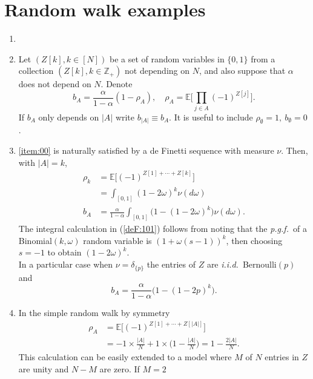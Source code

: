 \documentclass[preprint,11pt]{elsarticle}
\theoremstyle{remark}
\def\pgf{\emph{p.g.f.~}}
\def\iid{\emph{i.i.d.}~}
\begin{document}
{ \section{Random walk examples} \label{randomwalkexamples}
\begin{enumerate}[label=(\alph*)]
\item[]
%
\item \label{item:00}
Let $(Z[k], k \in [N])$ be a set of random variables in $\{0,1\}$ from a collection
$(Z[k], k \in \mathbb{Z}_+)$ not depending on $N$, and also suppose that $\alpha$ does not depend on $N$.
Denote
\begin{equation*}
b_A = \frac{\alpha}{1-\alpha}(1-\rho_A),\quad\rho_A = \mathbb{E}\Big [\prod_{j\in A}(-1)^{Z[j]}\Big ].
\label{bAdef:00}
\end{equation*}
If $b_A$ only depends on $|A|$ write $b_{|A|} \equiv b_A$.
It is useful to include $\rho_\emptyset = 1,\ b_\emptyset = 0$.
%
\item \label{item:01}
 \ref{item:00} is naturally satisfied by a de Finetti sequence with measure $\nu$.
Then, with $|A|=k$, 
\begin{align}
\rho_k &= \mathbb{E}\big [(-1)^{Z[1]+\cdots +Z[k]}\big ]\nonumber \\
& = \int_{[0,1]}(1-2\omega)^k\nu(d\omega)
\label{deF:101}\\
b_A &= \frac{\alpha}{1-\alpha}\int_{[0,1]}\big (1 - (1-2\omega)^k\big )\nu(d\omega).
\nonumber
\end{align}
The integral calculation in (\ref{deF:101}) follows from noting that the \pgf of a Binomial$(k,\omega)$ random variable is $(1+\omega(s-1))^k$, then choosing $s=-1$ to obtain
$(1-2\omega)^k$.\\
In a particular case when $\nu = \delta_{\{p\}}$ the entries of $Z$ are \iid  Bernoulli$(p)$ and 
\[
b_A =  \frac{\alpha}{1-\alpha}\big (1 - (1-2p)^k\big ).
\]
%
\item \label{item:02} In the simple random walk 
by symmetry
\begin{align*}
\rho_A &= \mathbb{E}\big [(-1)^{Z[1]+\cdots + Z[|A|]}\big ] \nonumber\\
 &= -1 \times \frac{|A|}{N} + 1 \times \Big ( 1 -  \frac{|A|}{N}\Big )
= 1 - \frac{2|A|}{N}.
\label{simplecalc:00}
\end{align*}
This calculation can be easily extended to a model where $M$ of $N$ entries in $Z$ are unity and $N-M$ are zero. If $M=2$

\end{enumerate}}
\end{document}
